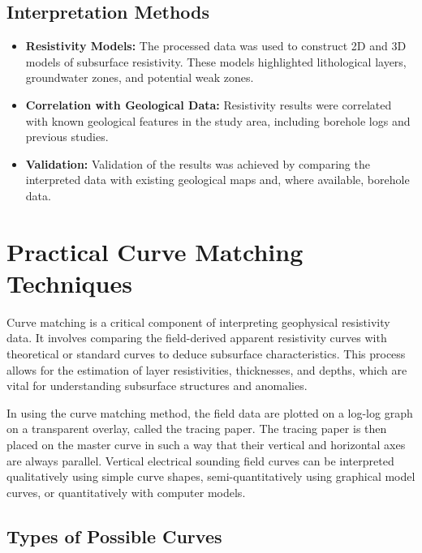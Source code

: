 \documentclass[12pt,a4paper]{report}
\begin{document}
\subsection{Interpretation Methods}
\begin{itemize}
    \item \textbf{Resistivity Models:} The processed data was used to construct 2D and 3D models of subsurface resistivity. These models highlighted lithological layers, groundwater zones, and potential weak zones.
    \item \textbf{Correlation with Geological Data:} Resistivity results were correlated with known geological features in the study area, including borehole logs and previous studies.
    \item \textbf{Validation:} Validation of the results was achieved by comparing the interpreted data with existing geological maps and, where available, borehole data.
\end{itemize}

\section{Practical Curve Matching Techniques}

Curve matching is a critical component of interpreting geophysical resistivity data. It involves comparing the field-derived apparent resistivity curves with theoretical or standard curves to deduce subsurface characteristics. This process allows for the estimation of layer resistivities, thicknesses, and depths, which are vital for understanding subsurface structures and anomalies.

In using the curve matching method, the field data are plotted on a log-log graph on a transparent overlay, called the tracing paper. The tracing paper is then placed on the master curve in such a way that their vertical and horizontal axes are always parallel. Vertical electrical sounding field curves can be interpreted qualitatively using simple curve shapes, semi-quantitatively using graphical model curves, or quantitatively with computer models.

\subsection{Types of Possible Curves}
\end{document}
